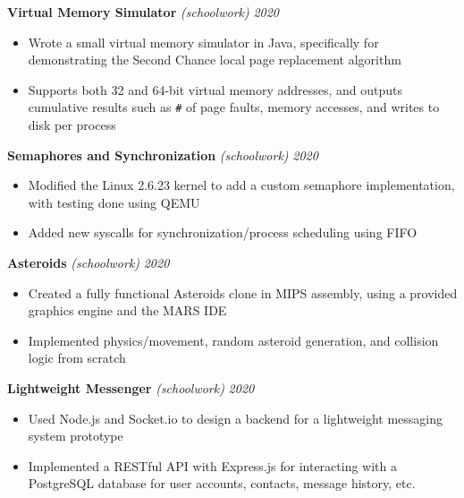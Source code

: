 \documentclass[10pt]{article}
\begin{document}
\begin{flushleft}
		\vspace{2.25mm}
		\textbf{Virtual Memory Simulator} \textit{(schoolwork)} \hfill \textit{\small 2020}
		\vspace{-2mm}
		\begin{itemize}
			\item Wrote a small virtual memory simulator in Java, specifically for demonstrating the Second Chance local page replacement algorithm
			\vspace{-2mm}
			\item Supports both 32 and 64-bit virtual memory addresses, and outputs cumulative results such as \verb!#! of page faults, memory accesses, and writes to disk per process
		\end{itemize}
		\vspace{-1.5mm}
		\pagebreak
		\textbf{Semaphores and Synchronization} \textit{(schoolwork)} \hfill \textit{\small 2020}
		\vspace{-2mm}
		\begin{itemize}
			\item Modified the Linux 2.6.23 kernel to add a custom semaphore implementation, with testing done using QEMU
			\vspace{-2mm}
			\item Added new syscalls for synchronization/process scheduling using FIFO
		\end{itemize}
		\vspace{-1.5mm}
		\textbf{Asteroids} \textit{(schoolwork)} \hfill \textit{\small 2020}
		\vspace{-2mm}
		\begin{itemize}
			\item Created a fully functional Asteroids clone in MIPS assembly, using a provided graphics engine and the MARS IDE
			\vspace{-2mm}
			\item Implemented physics/movement, random asteroid generation, and collision logic from scratch
		\end{itemize}
		\vspace{-1.5mm}
		\textbf{Lightweight Messenger} \textit{(schoolwork)} \hfill \textit{\small 2020}
		\vspace{-2mm}
		\begin{itemize}
			\item Used Node.js and Socket.io to design a backend for a lightweight messaging system prototype
			\vspace{-2mm}
			\item Implemented a RESTful API with Express.js for interacting with a PostgreSQL database for user accounts, contacts, message history, etc.

\end{itemize}
\end{flushleft}
\end{document}
